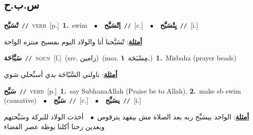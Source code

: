 \documentclass[10pt,a4paper,twoside]{article} %
\begin{document}
\begin{multicols}{2}
\vspace{-3mm}
\subsection*{\color{blue}\foreignlanguage{arabic}{س.ب.ح}\color{blue}{}} 

{\setlength\topsep{0pt}\textbf{\foreignlanguage{arabic}{تْسَبَّح}}\ {\color{gray}\texttt{//}\color{black}}\ \textsc{verb}\ [p.]\ \textbf{1.}~swim\ \ $\bullet$\ \ \setlength\topsep{0pt}\textbf{\foreignlanguage{arabic}{اِتْسَبَّح}}\ {\color{gray}\texttt{//}\color{black}}\ [c.]\ \ $\bullet$\ \ \setlength\topsep{0pt}\textbf{\foreignlanguage{arabic}{يِتْسَبَّح}}\ {\color{gray}\texttt{//}\color{black}}\ [i.]\  \begin{flushright}\color{gray}\foreignlanguage{arabic}{\textbf{\underline{\foreignlanguage{arabic}{أمثلة}}}: تْسَبَّحنا أنا والولاد اليوم بمسبح منتزه الواحة}\end{flushright}\color{black}} \vspace{2mm}

{\setlength\topsep{0pt}\textbf{\foreignlanguage{arabic}{سَبَّاحَة}}\ {\color{gray}\texttt{//}\color{black}}\ \textsc{noun}\ [f.]\ (src. \color{gray}\foreignlanguage{arabic}{رامين}\color{black})\ \color{gray}(msa. \foreignlanguage{arabic}{مِسْبَحَة}~\foreignlanguage{arabic}{\textbf{١.}})\color{black}\ \textbf{1.}~Misbaha (prayer beads)\  \begin{flushright}\color{gray}\foreignlanguage{arabic}{\textbf{\underline{\foreignlanguage{arabic}{أمثلة}}}: ناولني السَّبّاحَة بدي أسبِّحلي شوي}\end{flushright}\color{black}} \vspace{2mm}

{\setlength\topsep{0pt}\textbf{\foreignlanguage{arabic}{سَبَّح}}\ {\color{gray}\texttt{//}\color{black}}\ \textsc{verb}\ [p.]\ \textbf{1.}~say SubhanaAllah (Praise be to Allah).  \textbf{2.}~make sb swim (causative)\ \ $\bullet$\ \ \setlength\topsep{0pt}\textbf{\foreignlanguage{arabic}{سَبِّح}}\ {\color{gray}\texttt{//}\color{black}}\ [c.]\ \ $\bullet$\ \ \setlength\topsep{0pt}\textbf{\foreignlanguage{arabic}{يسَبِّح}}\ {\color{gray}\texttt{//}\color{black}}\ [i.]\  \begin{flushright}\color{gray}\foreignlanguage{arabic}{\textbf{\underline{\foreignlanguage{arabic}{أمثلة}}}: الواحد بيسَبِّح ربه بعد الصلاة مش بيقهد يترقوص\ $\bullet$\ \  أخذت الولاد للبركة وسَبَّحتهم وبعدين رحنا أكلنا بوظة عصر الفضاء}\end{flushright}\color{black}} \vspace{2mm}


\end{multicols}
\end{document}
